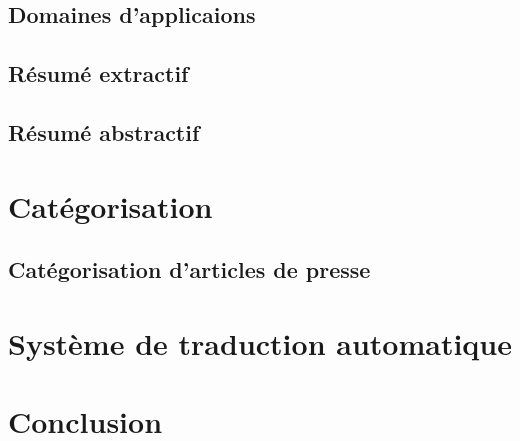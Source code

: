 \documentclass{report}
\begin{document}
    \subsection{Domaines d'applicaions}

    \subsection{Résumé extractif}

    \subsection{Résumé abstractif}


\section{Catégorisation}
    \subsection{Catégorisation d'articles de presse}


\section{Système de traduction automatique}


\section{Conclusion}


\Large


\end{document}

